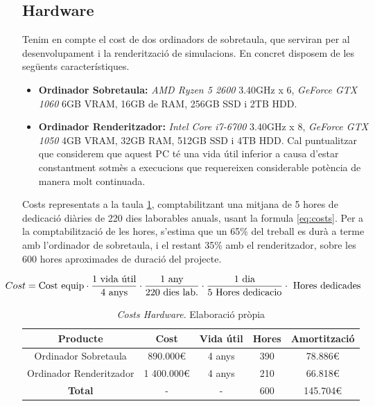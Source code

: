 \documentclass[a4paper]{article} %
\begin{document}
	\subsection{Hardware}
	Tenim en compte el cost de dos ordinadors de sobretaula, que serviran per al desenvolupament i la renderització de simulacions. En concret disposem de les següents característiques.
	\begin{itemize}
		\item \textbf{Ordinador Sobretaula:} \textit{AMD Ryzen 5 2600} 3.40GHz x 6, \textit{GeForce GTX 1060} 6GB VRAM, 16GB de RAM, 256GB SSD i 2TB HDD.
		\item \textbf{Ordinador Renderitzador:} \textit{Intel Core i7-6700} 3.40GHz x 8, \textit{GeForce GTX 1050} 4GB VRAM, 32GB RAM, 512GB SSD i 4TB HDD. Cal puntualitzar que considerem que aquest PC té una vida útil inferior a causa d'estar constantment sotmès a execucions que requereixen considerable potència de manera molt continuada.
	\end{itemize}
	Costs representats a la taula \ref{table:hardwareCosts}, comptabilitzant una mitjana de 5 hores de dedicació diàries de 220 dies laborables anuals, usant la formula \ref{eq:costs}. Per a la comptabilització de les hores, s'estima que un 65\% del treball es durà a terme amb l'ordinador de sobretaula, i el restant 35\% amb el renderitzador, sobre les 600 hores aproximades de duració del projecte. \par
	
	\begin{equation} \label{eq:costs}		\hspace*{-1cm}
		Cost  = \text{Cost equip} \cdot \frac{1 \text{ vida útil}}{4 \text{ anys} } \cdot \frac{1 \text{ any}}{220 \text{ dies lab.}} \cdot \frac{1 \text{ dia}}{5 \text{ Hores dedicacio}} \cdot \text{ Hores dedicades}
	\end{equation}
	
	\begin{table}[h!]
		\centering
		\begin{tabular}{|| c || c | c | c| c||}
			\hline
			\textbf{Producte} & \textbf{Cost} & \textbf{Vida útil} & \textbf{Hores}& \textbf{Amortització} \\
			\hline \hline
			Ordinador Sobretaula & 890.000\euro & 4 anys &390& 78.886\euro \\
			Ordinador Renderitzador & 1 400.000\euro & 4 anys &210& 66.818\euro \\
			\hline \hline
			\textbf{Total} & - & - & 600 & 145.704\euro \\
			\hline
		\end{tabular}
		\caption[\textit{Costs Hardware}]{\textit{\small Costs Hardware}. Elaboració pròpia}
		\label{table:hardwareCosts}
	\end{table}
\end{document}
